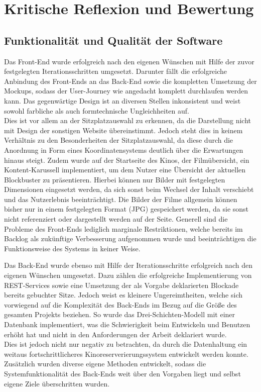 \section{Kritische Reflexion und Bewertung}
\multipleauthorsection{\authorRF}{\authorEJ}

\subsection{Funktionalität und Qualität der Software}
\authorsection{\authorRF}

Das Front-End wurde erfolgreich nach den eigenen Wünschen mit Hilfe der zuvor festgelegten Iterationsschritten umgesetzt.
Darunter fällt die erfolgreiche Anbindung des Front-Ends an das Back-End sowie die kompletten Umsetzung der Mockups, sodass der User-Journey wie angedacht komplett durchlaufen werden kann.
Das gegenwärtige Design ist an diversen Stellen inkonsistent und weist sowohl farbliche als auch formtechnische Ungleichheiten auf. \\
Dies ist vor allem an der Sitzplatzauswahl zu erkennen, da die Darstellung nicht mit Design der sonstigen Website übereinstimmt.
Jedoch steht dies in keinem Verhältnis zu den Besonderheiten der Sitzplatzauswahl, da diese durch die Anordnung in Form eines Koordinatensystems deutlich über die Erwartungen hinaus steigt.
Zudem wurde auf der Startseite des Kinos, der Filmübersicht, ein Kontent-Karussell implementiert, um dem Nutzer eine Übersicht der aktuellen Blockbuster zu präsentieren.
Hierbei können nur Bilder mit festgelegten Dimensionen eingesetzt werden, da sich sonst beim Wechsel der Inhalt verschiebt und das Nutzerlebnis beeinträchtigt.
Die Bilder der Filme allgemein können bisher nur in einem festgelegten Format (JPG) gespeichert werden, da sie sonst nicht referenziert oder dargestellt werden auf der Seite.
Generell sind die Probleme des Front-Ends lediglich marginale Restriktionen, welche bereits im Backlog als zukünftige Verbesserung aufgenommen wurde und beeinträchtigen die Funktionsweise des Systems in keiner Weise.

Das Back-End wurde ebenso mit Hilfe der Iterationsschritte erfolgreich nach den eigenen Wünschen umgesetzt.
Dazu zählen die erfolgreiche Implementierung von \acs{REST}-Services sowie eine Umsetzung der als Vorgabe deklarierten Blockade bereits gebuchter Sitze.
Jedoch weist es kleinere Ungereimtheiten, welche sich vorwiegend auf die Komplexität des Back-Ends im Bezug auf die Größe des gesamten Projekts beziehen.
So wurde das Drei-Schichten-Modell mit einer Datenbank implementiert, was die Schwierigkeit beim Entwickeln und Benutzen erhöht hat und nicht in den Anforderungen der Arbeit deklariert wurde.\\
Dies ist jedoch nicht nur negativ zu betrachten, da durch die Datenhaltung ein weitaus fortschrittlicheres Kinoreserverierungssystem entwickelt werden konnte.
Zusätzlich wurden diverse eigene Methoden entwickelt, sodass die Systemfunktionalität des Back-Ends weit über den Vorgaben liegt und selbst eigene Ziele überschritten wurden.

